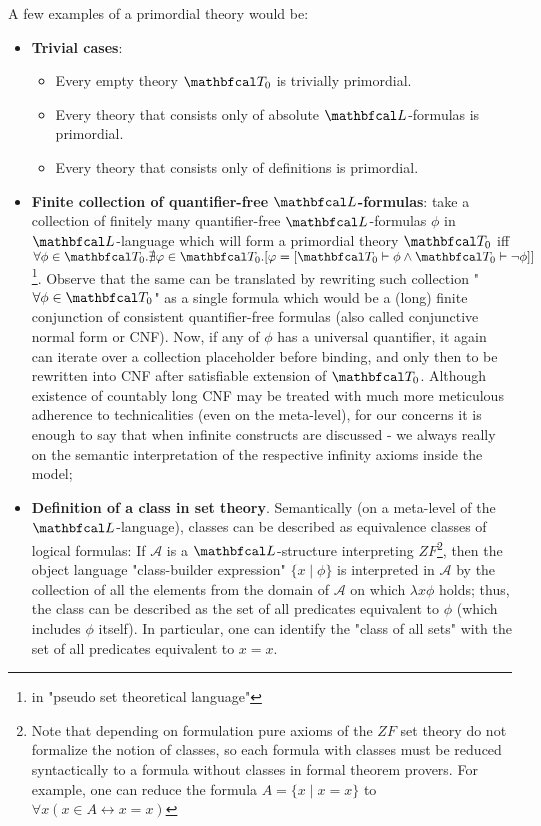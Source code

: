 A few examples of a primordial theory would be:
\begin{itemize}
  \item \textbf{Trivial cases}: 
    \begin{itemize}
      \item Every empty theory $\LsT_0$ is trivially primordial.
      \item Every theory that consists only of absolute $\lsign$-formulas is primordial.
      \item Every theory that consists only of definitions is primordial.
    \end{itemize}
  \item \textbf{Finite collection of quantifier-free $\lsign$-formulas}: take a collection of finitely many quantifier-free $\lsign$-formulas $\phi$ in $\lsign$-language which will form a primordial theory $\LsT_0$ iff $\forall \phi \in \LsT_0 . \nexists \varphi \in \LsT_0 . [\varphi = [\LsT_0 \vdash \phi \land \LsT_0 \vdash \neg\phi]]$\footnote{in "pseudo set theoretical language"}. Observe that the same can be translated by rewriting such collection "$\forall \phi \in \LsT_0$" as a single formula which would be a (long) finite conjunction of consistent quantifier-free formulas (also called conjunctive normal form or CNF). Now, if any of $\phi$ has a universal quantifier, it again can iterate over a collection placeholder before binding, and only then to be rewritten into CNF after satisfiable extension of $\LsT_0$. Although existence of countably long CNF may be treated with much more meticulous adherence to technicalities (even on the meta-level), for our concerns it is enough to say that when infinite constructs are discussed - we always really on the semantic interpretation of the respective infinity axioms inside the model;
  \item \textbf{Definition of a class in set theory}. Semantically (on a meta-level of the $\lsign$-language), classes can be described as equivalence classes of logical formulas\cite{enwiki:1125916999}: If $\mathcal{A}$ is a $\lsign$-structure interpreting $ZF$\footnote{Note that depending on formulation pure axioms of the $ZF$ set theory do not formalize the notion of classes, so each formula with classes must be reduced syntactically to a formula without classes in formal theorem provers. For example, one can reduce the formula $A=\{x\mid x=x\}$ to $\forall x(x\in A\leftrightarrow x=x)$}, then the object language "class-builder expression" $\{x\mid \phi \}$ is interpreted in $\mathcal{A}$ by the collection of all the elements from the domain of $\mathcal{A}$ on which $\lambda x\phi$ holds; thus, the class can be described as the set of all predicates equivalent to $\phi$ (which includes $\phi$  itself). In particular, one can identify the "class of all sets" with the set of all predicates equivalent to $x=x$.

\end{itemize}
